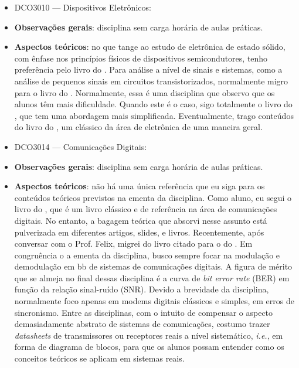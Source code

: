 \documentclass{article}
\begin{document}
\begin{itemize}
\begin{itemize}
        \item \textbf{Aspectos teóricos}: normalmente, eu sigo apenas o livro do \textcite{haykinIntroductionAnalogDigital2006}. Entre as disciplinas, com o intuito de compensar o aspecto demasiadamente abstrato de sistemas de comunicações, costumo trazer \textit{datasheets} de transmissores ou receptores reais a nível sistemático, \textit{i.e.}, em forma de diagrama de blocos, para que os alunos possam entender como os conceitos teóricos se aplicam em sistemas reais.
    \end{itemize}
    \item DCO3010 --- Dispositivos Eletrônicos:
    \item \textbf{Observações gerais}: disciplina sem carga horária de aulas práticas.
    \item \textbf{Aspectos teóricos}: no que tange ao estudo de eletrônica de estado sólido, com ênfase nos princípios físicos de dispositivos semicondutores, tenho preferência pelo livro do \textcite{sedraMicroelectronicCircuits2019}. Para análise a nível de sinais e sistemas, como a análise de pequenos sinais em circuitos transistorizados, normalmente migro para o livro do \textcite{boylestadElectronicDevicesCircuit2014}. Normalmente, essa é uma disciplina que observo que os alunos têm mais dificuldade. Quando este é o caso, sigo totalmente o livro do \textcite{boylestadElectronicDevicesCircuit2014}, que tem uma abordagem mais simplificada. Eventualmente, trago conteúdos do livro do \textcite{hillArtElectronics2024}, um clássico da área de eletrônica de uma maneira geral.
    \item DCO3014 --- Comunicações Digitais:
    \item \textbf{Observações gerais}: disciplina sem carga horária de aulas práticas.
    \item \textbf{Aspectos teóricos}: não há uma única referência que eu siga para os conteúdos teóricos previstos na ementa da disciplina. Como aluno, eu segui o livro do \textcite{proakisDigitalCommunications2007}, que é um livro clássico e de referência na área de comunicações digitais. No entanto, a bagagem teórica que absorvi nesse assunto está pulverizada em diferentes artigos, slides, e livros. Recentemente, após conversar com o Prof. Felix, migrei do livro citado para o do \textcite{simonDigitalCommunicationTechniques1994}. Em congruência o a ementa da disciplina, busco sempre focar na modulação e demodulação em \gls{bb} de sistemas de comunicações digitais. A figura de mérito que se almeja no final dessas disciplina é a curva de \textit{bit error rate} (BER) em função da relação sinal-ruído (SNR). Devido a brevidade da disciplina, normalmente foco apenas em modems digitais clássicos e simples, em erros de sincronismo. Entre as disciplinas, com o intuito de compensar o aspecto demasiadamente abstrato de sistemas de comunicações, costumo trazer \textit{datasheets} de transmissores ou receptores reais a nível sistemático, \textit{i.e.}, em forma de diagrama de blocos, para que os alunos possam entender como os conceitos teóricos se aplicam em sistemas reais.

\end{itemize}
\end{document}
